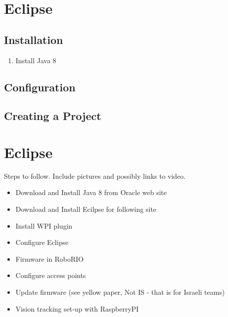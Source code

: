 \chapter{Eclipse}


\section{Installation}

\begin{enumerate}
\item Install Java 8
\end{enumerate}



\section{Configuration}



\section{Creating a Project}



\chapter{Eclipse}


Steps to follow. Include pictures and possibly links to video.

\begin{itemize}
	\item Download and Install Java 8 from Oracle web site
	\item Download and Install Ecilpse for following site
	\item Install WPI plugin
	\item Configure Eclipse
	\item Firmware in RoboRIO
	\item Configure access points
	\item Update firmware (see yellow paper, Not IS - that is for Israeli teams)
	\item Vision tracking set-up with RaspberryPI
\end{itemize}
